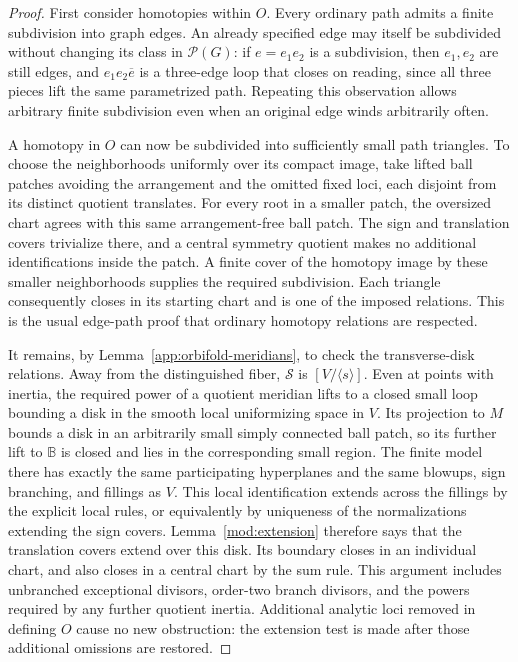 \documentclass[11pt,reqno]{amsart}
\numberwithin{equation}{section}
\theoremstyle{definition}
\theoremstyle{remark}
\begin{document}
\begin{proof}
First consider homotopies within $O$.  Every ordinary path admits a
finite subdivision into graph edges.  An already specified edge may
itself be subdivided without changing its class in $\mathcal P(G)$:
if $e=e_1e_2$ is a subdivision, then $e_1,e_2$ are still edges, and
$e_1e_2\overline e$ is a three-edge loop that closes on reading,
since all three pieces lift the same parametrized path.  Repeating
this observation allows arbitrary finite subdivision even when an
original edge winds arbitrarily often.

A homotopy in $O$ can now be subdivided into sufficiently small path
triangles.  To choose the neighborhoods uniformly over its compact
image, take lifted ball patches avoiding the arrangement and the
omitted fixed loci, each disjoint from its distinct quotient
translates.  For every root in a smaller patch, the oversized chart
agrees with this same arrangement-free ball patch.  The sign and
translation covers trivialize there, and a central symmetry quotient
makes no additional identifications inside the patch.  A finite
cover of the homotopy image by these smaller neighborhoods supplies
the required subdivision.  Each triangle consequently closes in its
starting chart and is one of the imposed relations.  This is the
usual edge-path proof that ordinary homotopy relations are respected.

It remains, by Lemma~\ref{app:orbifold-meridians}, to check the
transverse-disk relations.  Away from the distinguished fiber,
$\mathcal S$ is $[V/\langle s\rangle]$.  Even at points with inertia, the
required power of a quotient meridian lifts to a closed small loop
bounding a disk in the smooth local uniformizing space in $V$.
Its projection to $M$ bounds a disk in an arbitrarily small
simply connected ball patch, so its further lift to $\mathbb B$ is closed
and lies in the corresponding small region.  The finite model there
has exactly the same participating hyperplanes and the same blowups, sign branching, and fillings as
$V$.  This local identification extends across the fillings by the
explicit local rules, or equivalently by uniqueness of the
normalizations extending the sign covers.  Lemma~\ref{mod:extension}
therefore says that the translation covers extend over this disk.
Its boundary closes in an individual chart, and also closes in a
central chart by the sum rule.  This argument includes unbranched
exceptional divisors, order-two branch divisors, and the powers
required by any further quotient inertia.  Additional analytic loci
removed in defining $O$ cause no new obstruction: the extension test
is made after those additional omissions are restored.


\end{proof}
\end{document}
